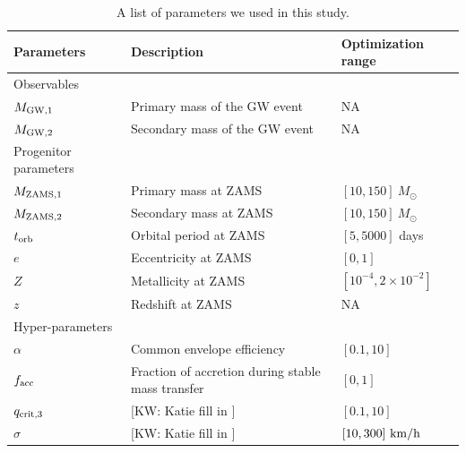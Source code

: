 \documentclass[twocolumn]{aastex631}
\newcommand{\kw}[1]{{\color{rb4}[KW: #1 ]}}
\begin{document}
\begin{table}[hbt!]
    \begin{center}
    \begin{tabular}{ l l l }
    \hline
    \hline
    Parameters &  Description & Optimization range\\
    \hline
    \hline
    Observables &\ &\  \\
    \hline
    \hline
    $M_{\rm GW,1}$ & Primary mass of the GW event & NA \\
    $M_{\rm GW,2}$ & Secondary mass of the GW event  & NA\\
    \hline
    \hline
    Progenitor parameters &\ &\  \\
    \hline
    \hline
    $M_{\rm ZAMS,1}$ & Primary mass at ZAMS & $[10,150]\ M_{\odot}$\\
    $M_{\rm ZAMS,2}$ & Secondary mass at ZAMS & $[10,150]\ M_{\odot}$\\
    $t_{\rm orb}$ & Orbital period at ZAMS & $[5,5000]$ days\\
    $e$ & Eccentricity at ZAMS & $[0,1]$\\
    $Z$ & Metallicity at ZAMS & $[10^{-4},2\times10^{-2}]$\\
    $z$ & Redshift at ZAMS & NA\\
    \hline
    \hline
    Hyper-parameters &\ &\ \\
    \hline
    \hline
    
    $\alpha$ & Common envelope efficiency & $[0.1,10]$\\
    $f_{\rm acc}$ & Fraction of accretion during stable mass transfer & $[0,1]$\\
    $q_{\rm crit,3}$ & \kw{Katie fill in} & $[0.1,10]$\\
    $\sigma$ & \kw{Katie fill in}& $[10,300]\ {\rm km/h}$\\


    \hline
    \hline
    \end{tabular}
    \caption{A list of parameters we used in this study.}
    \label{tab:parameters}
    \end{center}
\end{table}
    
\end{document}
